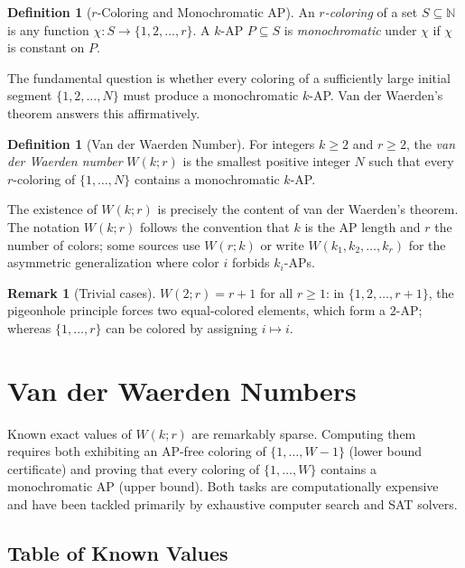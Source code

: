 \documentclass[12pt,a4paper]{amsart}
\theoremstyle{definition}
\newtheorem{definition}[theorem]{Definition}
\newtheorem{remark}[theorem]{Remark}
\newcommand{\N}{\mathbb{N}}
\begin{document}
\begin{definition}[$r$-Coloring and Monochromatic AP]
An \emph{$r$-coloring} of a set $S \subseteq \N$ is any function
$\chi: S \to \{1, 2, \ldots, r\}$.
A $k$-AP $P \subseteq S$ is \emph{monochromatic} under $\chi$ if $\chi$ is constant on $P$.
\end{definition}

The fundamental question is whether every coloring of a sufficiently large initial
segment $\{1, 2, \ldots, N\}$ must produce a monochromatic $k$-AP. Van der Waerden's
theorem answers this affirmatively.

\begin{definition}[Van der Waerden Number]
For integers $k \geq 2$ and $r \geq 2$, the \emph{van der Waerden number} $W(k;r)$
is the smallest positive integer $N$ such that every $r$-coloring of $\{1, \ldots, N\}$
contains a monochromatic $k$-AP.
\end{definition}

The existence of $W(k;r)$ is precisely the content of van der Waerden's theorem.
The notation $W(k; r)$ follows the convention that $k$ is the AP length and $r$ the
number of colors; some sources use $W(r; k)$ or write $W(k_1, k_2, \ldots, k_r)$ for
the asymmetric generalization where color $i$ forbids $k_i$-APs.

\begin{remark}[Trivial cases]
$W(2; r) = r+1$ for all $r \geq 1$: in $\{1, 2, \ldots, r+1\}$, the pigeonhole principle
forces two equal-colored elements, which form a $2$-AP; whereas $\{1,\ldots,r\}$ can be
colored by assigning $i \mapsto i$.
\end{remark}

\section{Van der Waerden Numbers}\label{sec:vdw-numbers}

Known exact values of $W(k;r)$ are remarkably sparse. Computing them requires both
exhibiting an AP-free coloring of $\{1, \ldots, W-1\}$ (lower bound certificate) and
proving that every coloring of $\{1, \ldots, W\}$ contains a monochromatic AP
(upper bound). Both tasks are computationally expensive and have been tackled primarily
by exhaustive computer search and SAT solvers.

\subsection{Table of Known Values}
\end{document}
